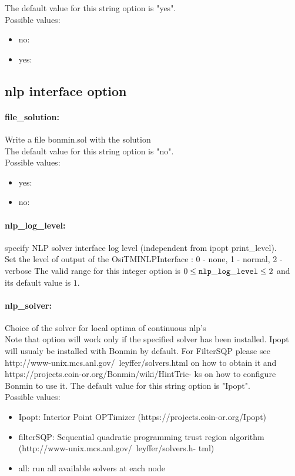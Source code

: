 The default value for this string option is "yes".
\\ 
Possible values:
\begin{itemize}
   \item no: 
   \item yes: 
\end{itemize}

\subsection{nlp interface option}
\label{sec:nlp_interface_option}
\paragraph{\bf file\_solution:}\label{sec:file_solution} Write a file bonmin.sol with the solution $\;$ \\

The default value for this string option is "no".
\\ 
Possible values:
\begin{itemize}
   \item yes: 
   \item no: 
\end{itemize}

\paragraph{\bf nlp\_log\_level:}\label{sec:nlp_log_level} specify NLP solver interface log level (independent from ipopt print\_level). $\;$ \\
 Set the level of output of the OsiTMINLPInterface
: 0 - none, 1 - normal, 2 - verbose The valid range for this integer option is
$0 \le {\tt nlp\_log\_level } \le 2$
and its default value is $1$.


\paragraph{\bf nlp\_solver:}\label{sec:nlp_solver} Choice of the solver for local optima of continuous nlp's $\;$ \\
 Note that option will work only if the specified
solver has been installed. Ipopt will usualy be
installed with Bonmin by default. For FilterSQP
please see
http://www-unix.mcs.anl.gov/~leyffer/solvers.html
on how to obtain it and
https://projects.coin-or.org/Bonmin/wiki/HintTric-
ks on how to configure Bonmin to use it.
The default value for this string option is "Ipopt".
\\ 
Possible values:
\begin{itemize}
   \item Ipopt: Interior Point OPTimizer
(https://projects.coin-or.org/Ipopt)
   \item filterSQP: Sequential quadratic programming trust region
algorithm
(http://www-unix.mcs.anl.gov/~leyffer/solvers.h-
tml)
   \item all: run all available solvers at each node
\end{itemize}

